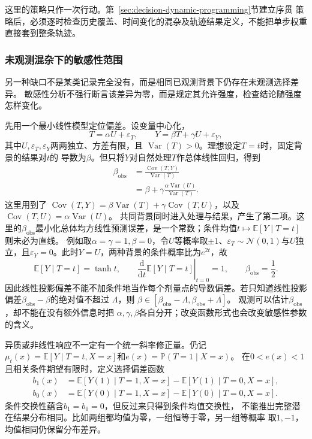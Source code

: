 这里的策略只作一次行动。第~\ref{sec:decision-dynamic-programming}节建立序贯
策略后，必须逐时检查历史覆盖、时间变化的混杂及轨迹结果定义，不能把单步权重
直接套到整条轨迹。

\subsubsection{未观测混杂下的敏感性范围}
\label{sec:causal-sensitivity-ranges}

另一种缺口不是某类记录完全没有，而是相同已观测背景下仍存在未观测选择差异。
敏感性分析不强行断言该差异为零，而是规定其允许强度，检查结论随强度怎样变化。

先用一个最小线性模型定位偏差。设变量中心化，
\[
  T=\alpha U+\varepsilon_T,\qquad
  Y=\beta T+\gamma U+\varepsilon_Y,
\]
其中\(U,\varepsilon_T,\varepsilon_Y\)两两独立、方差有限，且
\(\operatorname{Var}(T)>0\)。理想设定\(T=t\)时，固定背景的结果对\(t\)的
导数为\(\beta\)。但只将\(Y\)对自然处理\(T\)作总体线性回归，得到
\begin{equation}
  \begin{aligned}
    \beta_{\mathrm{obs}}
    &=\frac{\operatorname{Cov}(T,Y)}{\operatorname{Var}(T)}\\
    &=\beta+
      \gamma\frac{\alpha\operatorname{Var}(U)}{\operatorname{Var}(T)}.
  \end{aligned}
  \label{eq:causal-linear-confounding-bias}
\end{equation}
这里用到了
\(\operatorname{Cov}(T,Y)=\beta\operatorname{Var}(T)
+\gamma\operatorname{Cov}(T,U)\)，以及
\(\operatorname{Cov}(T,U)=\alpha\operatorname{Var}(U)\)。
共同背景同时进入处理与结果，产生了第二项。这里的\(\beta_{\mathrm{obs}}\)最小化总体均方线性预测误差，是一个常数；条件均值\(t\mapsto\mathbb E[Y\mid T=t]\)则未必为直线。
例如取\(\alpha=\gamma=1,\beta=0\)，令\(U\)等概率取\(\pm1\)、\(\varepsilon_T\sim\mathcal N(0,1)\)与\(U\)独立，且\(\varepsilon_Y=0\)。此时\(Y=U\)，两种背景的条件概率比为\(e^{2t}\)，故
\[
 \mathbb E[Y\mid T=t]=\tanh t,\qquad
 \left.\frac{\mathrm d}{\mathrm dt}\mathbb E[Y\mid T=t]\right|_{t=0}=1,
 \qquad\beta_{\mathrm{obs}}=\frac12.
\]
因此线性投影偏差不能不加条件地当作每个剂量点的导数偏差。若只知道线性投影偏差\(\beta_{\mathrm{obs}}-\beta\)的绝对值不超过
\(\Lambda\)，则
\(\beta\in[\beta_{\mathrm{obs}}-\Lambda,\beta_{\mathrm{obs}}+\Lambda]\)。
观测可以估计\(\beta_{\mathrm{obs}}\)，却不能在没有额外信息时把
\(\alpha,\gamma,\beta\)各自分开；改变函数形式也会改变敏感性参数的含义。

异质或非线性响应不一定有一个统一斜率修正量。仍记
\(\mu_t(x)=\mathbb E[Y\mid T=t,X=x]\)和\(e(x)=\mathbb P(T=1\mid X=x)\)。
在\(0<e(x)<1\)且相关条件期望有限时，定义选择偏差函数
\[
  \begin{aligned}
    b_1(x)&=\mathbb E[Y(1)\mid T=1,X=x]
            -\mathbb E[Y(1)\mid T=0,X=x],\\
    b_0(x)&=\mathbb E[Y(0)\mid T=1,X=x]
            -\mathbb E[Y(0)\mid T=0,X=x].
  \end{aligned}
\]
条件交换性蕴含\(b_1=b_0=0\)，但反过来只得到条件均值交换性，
不能推出完整潜在结果分布相同。比如两组都均值为零，一组恒等于零，另一组等概率
取\(1,-1\)，均值相同仍保留分布差异。

